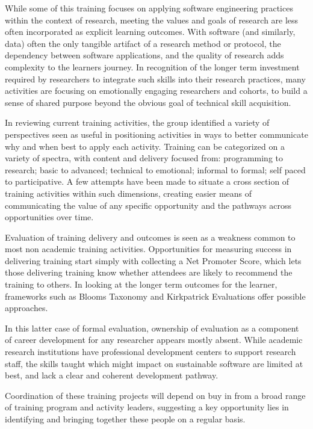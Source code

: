 While some of this training focuses on applying software engineering practices
within the context of research, meeting the values and goals of research are
less often incorporated as explicit learning outcomes. With software (and
similarly, data) often the only tangible artifact of a research method or
protocol, the dependency between software applications, and the quality of
research adds complexity to the learners journey. In recognition of the longer
term investment required by researchers to integrate such skills into their
research practices, many activities are focusing on emotionally engaging
researchers and cohorts, to build a sense of shared purpose beyond the obvious
goal of technical skill acquisition.

In reviewing current training activities, the group identified a variety of
perspectives seen as useful in positioning activities in ways to better
communicate why and when best to apply each activity. Training can be
categorized on a variety of spectra, with content and delivery focused from:
programming to research; basic to advanced; technical to emotional; informal to
formal; self paced to participative. A few attempts have been made to situate a
cross section of training activities within such dimensions, creating easier
means of communicating the value of any specific opportunity and the pathways
across opportunities over time.

Evaluation of training delivery and outcomes is seen as a weakness common to
most non academic training activities. Opportunities for measuring success in
delivering training start simply with collecting a Net Promoter Score, which
lets those delivering training know whether attendees are likely to recommend
the training to others. In looking at the longer term outcomes for the learner,
frameworks such as Blooms Taxonomy and Kirkpatrick Evaluations offer possible
approaches.

In this latter case of formal evaluation, ownership of evaluation as a component
of career development for any researcher appears mostly absent. While academic
research institutions have professional development centers to support research
staff, the skills taught which might impact on sustainable software are limited
at best, and lack a clear and coherent development pathway.

Coordination of these training projects will depend on buy in from a broad range
of training program and activity leaders, suggesting a key opportunity lies in
identifying and bringing together these people on a regular basis.

